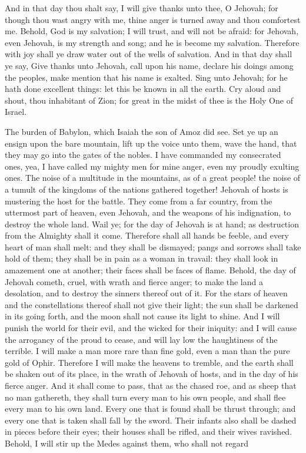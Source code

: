And in that day thou shalt say, I will give thanks unto thee, O Jehovah; for though thou wast angry with me, thine anger is turned away and thou comfortest me. Behold, God is my salvation; I will trust, and will not be afraid: for Jehovah, even Jehovah, is my strength and song; and he is become my salvation. Therefore with joy shall ye draw water out of the wells of salvation. And in that day shall ye say, Give thanks unto Jehovah, call upon his name, declare his doings among the peoples, make mention that his name is exalted. Sing unto Jehovah; for he hath done excellent things: let this be known in all the earth. Cry aloud and shout, thou inhabitant of Zion; for great in the midst of thee is the Holy One of Israel. 

The burden of Babylon, which Isaiah the son of Amoz did see.  Set ye up an ensign upon the bare mountain, lift up the voice unto them, wave the hand, that they may go into the gates of the nobles. I have commanded my consecrated ones, yea, I have called my mighty men for mine anger, even my proudly exulting ones. The noise of a multitude in the mountains, as of a great people! the noise of a tumult of the kingdoms of the nations gathered together! Jehovah of hosts is mustering the host for the battle. They come from a far country, from the uttermost part of heaven, even Jehovah, and the weapons of his indignation, to destroy the whole land.  Wail ye; for the day of Jehovah is at hand; as destruction from the Almighty shall it come. Therefore shall all hands be feeble, and every heart of man shall melt: and they shall be dismayed; pangs and sorrows shall take hold of them; they shall be in pain as a woman in travail: they shall look in amazement one at another; their faces shall be faces of flame. Behold, the day of Jehovah cometh, cruel, with wrath and fierce anger; to make the land a desolation, and to destroy the sinners thereof out of it. For the stars of heaven and the constellations thereof shall not give their light; the sun shall be darkened in its going forth, and the moon shall not cause its light to shine. And I will punish the world for their evil, and the wicked for their iniquity: and I will cause the arrogancy of the proud to cease, and will lay low the haughtiness of the terrible. I will make a man more rare than fine gold, even a man than the pure gold of Ophir. Therefore I will make the heavens to tremble, and the earth shall be shaken out of its place, in the wrath of Jehovah of hosts, and in the day of his fierce anger. And it shall come to pass, that as the chased roe, and as sheep that no man gathereth, they shall turn every man to his own people, and shall flee every man to his own land. Every one that is found shall be thrust through; and every one that is taken shall fall by the sword. Their infants also shall be dashed in pieces before their eyes; their houses shall be rifled, and their wives ravished.  Behold, I will stir up the Medes against them, who shall not regard 